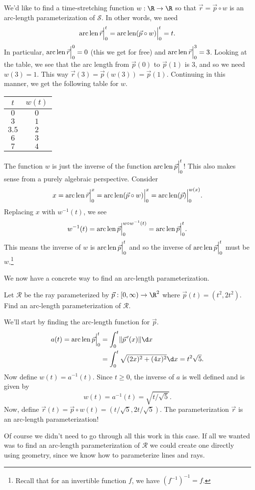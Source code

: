 We'd like to find a time-stretching function $w:\R\to\R$ so that $\vec r=\vec p\circ w$ is an arc-length
parameterization of $\mathcal S$.  In other words, we need
\[
	\operatorname{arc\,len} \vec r \Big|_{0}^{t} = \operatorname{arc\,len} (\vec p\circ w) \Big|_{0}^{t}=t.
\]
In particular, $\operatorname{arc\,len} \vec r \Big|_{0}^{0}=0$ (this we get for free) and $\operatorname{arc\,len} \vec r \Big|_{0}^{3}=3$.
Looking at the table, we see that the arc length from $\vec p(0)$ to $\vec p(1)$ is $3$, and so we need
$w(3) =1$.  This way $\vec r(3) = \vec p(w (3)) = \vec p(1)$.  Continuing in this manner, we get the following
table for $w$.
\begin{center}
	\begin{tabular}{c|c}
		$t$ & $w(t)$\\
		\hline
		$0$ & $0$\\
		$3$ & $1$\\
		$3.5$ & $2$\\
		$6$ & $3$\\
		$7$ & $4$
	\end{tabular}
\end{center}

The function $w$ is just the inverse of the function $\operatorname{arc\,len} \vec p \Big|_{0}^{t}$!  This also makes sense
from a purely algebraic perspective.  Consider
\[
	x=\operatorname{arc\,len} \vec r \Big|_{0}^{x} = \operatorname{arc\,len} (\vec p\circ w) \Big|_{0}^{x}=\operatorname{arc\,len} (\vec p) \Big|_{0}^{w(x)}.
\]
Replacing $x$ with $w^{-1}(t)$, we see
\[
	w^{-1}(t) = \operatorname{arc\,len} \vec p \Big|_{0}^{w\circ w^{-1}(t)} = \operatorname{arc\,len} \vec p \Big|_{0}^{t}.
\]
This means the inverse of $w$ is $\operatorname{arc\,len} \vec p \Big|_{0}^{t}$ and so the inverse of $\operatorname{arc\,len} \vec p \Big|_{0}^{t}$
must be $w$.\footnote{ Recall that for an invertible function $f$, we have $(f^{-1})^{-1}=f$.}

We now have a concrete way to find an arc-length parameterization.
\begin{example}
	Let $\mathcal R$ be the ray parameterized by 
	$\vec p:[0,\infty)\to\R^2$ where $\vec p(t) = (t^2,2t^2)$.  Find an arc-length
	parameterization of $\mathcal R$.

	We'll start by finding the arc-length function for $\vec p$.
	\begin{align*}
		a(t)=\Arclenfrom{\vec p}{0}{t} &= \int_0^t \norm{\vec p\,'(x)}\d x\\
		&=\int_0^t \sqrt{(2x)^2+(4x)^2}\d x = t^2\sqrt{5}.
	\end{align*}
	Now define $w(t)=a^{-1}(t)$.  Since $t\geq 0$, the inverse of $a$ is well defined
	and is given by
	\[
		w(t)=a^{-1}(t) = \sqrt{t/\sqrt{5}}.
	\]
	Now, define $\vec r(t) = \vec p\circ w(t)=(t/\sqrt{5},2t/\sqrt{5})$.  The parameterization
	$\vec r$ is an arc-length parameterization!

	Of course we didn't need to go through all this work in this case.  If all we wanted was
	to find an arc-length parameterization of $\mathcal R$ we could create one directly using
	geometry, since we know how to parameterize lines and rays.
\end{example}

